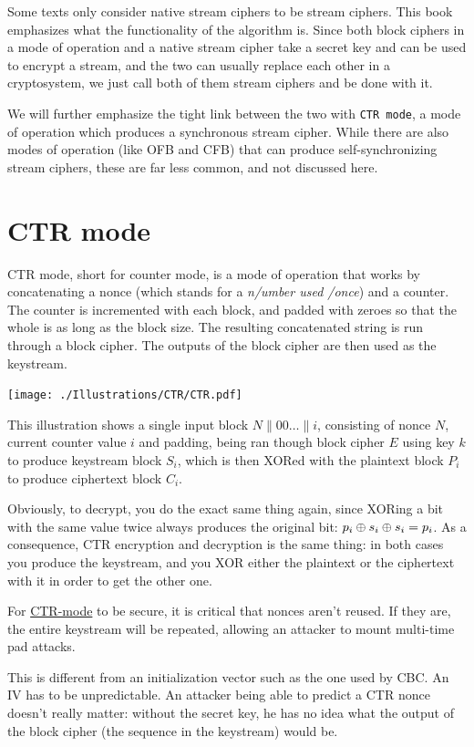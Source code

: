 \documentclass[11pt,ebook,table,dvipsnames]{memoir}
\begin{document}
Some texts only consider native \glspl{stream cipher} to be stream
ciphers. This book emphasizes what the functionality of the algorithm
is. Since both block ciphers in a \gls{mode of operation} and a native
stream cipher take a secret key and can be used to encrypt a stream,
and the two can usually replace each other in a cryptosystem, we just
call both of them stream ciphers and be done with it.

We will further emphasize the tight link between the two with \texttt{CTR
mode}, a mode of operation which produces a synchronous stream
cipher. While there are also modes of operation (like OFB and CFB)
that can produce self-synchronizing stream ciphers, these are far
less common, and not discussed here.
\section{\label{CTR-mode}CTR mode}
\label{sec-2-3-12}

\gls{CTR mode}, short for counter mode, is a \gls{mode of operation}
that works by concatenating a \gls{nonce} (which stands for a \emph{n/umber
used /once}) and a counter. The counter is incremented with each
block, and padded with zeroes so that the whole is as long as the
block size. The resulting concatenated string is run through a block
cipher. The outputs of the block cipher are then used as the
keystream.

\texttt{[image: ./Illustrations/CTR/CTR.pdf]}

This illustration shows a single input block $N \| 00 \ldots \| i$,
consisting of nonce $N$, current counter value $i$ and padding, being
ran though block cipher $E$ using key $k$ to produce keystream block
$S_i$, which is then XORed with the plaintext block $P_i$ to produce
ciphertext block $C_i$.

Obviously, to decrypt, you do the exact same thing again, since XORing
a bit with the same value twice always produces the original bit: $p_i
\oplus s_i \oplus s_i = p_i$. As a consequence, CTR encryption and
decryption is the same thing: in both cases you produce the keystream,
and you XOR either the plaintext or the ciphertext with it in order to
get the other one.

For \hyperref[CTR mode]{CTR-mode} to be secure, it is critical that \glspl{nonce} aren't
reused. If they are, the entire keystream will be repeated, allowing
an attacker to mount multi-time pad attacks.

This is different from an \gls{initialization vector} such as the one
used by CBC. An \gls{IV} has to be unpredictable. An attacker being
able to predict a CTR \gls{nonce} doesn't really matter: without the
secret key, he has no idea what the output of the block cipher (the
sequence in the keystream) would be.
\end{document}
